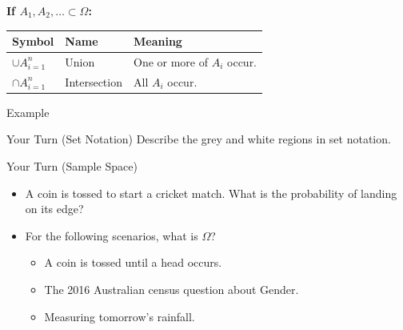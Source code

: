 \documentclass[t,xcolor=pdftex,dvipsnames,table]{beamer}\usepackage[]{graphicx}\usepackage[]{color}
\def \setA{ (0,0) circle (1cm) }
\def \setB{ (1.5,0) circle (1cm) }
\def \setC{ (0.6,1.5) circle (1cm) }
\def \setO{ (-2, -1.5) rectangle (3.5, 2.75) }
\begin{document}
\begin{frame}[fragile]{}
\vspace{.5cm}
{\bf If $A_{1}, A_{2}, \ldots \subset \Omega$:} 

\vspace{.5cm}
\begin{tabular}{lll}
Symbol & Name & Meaning \\ \hline
$\cup A_{i=1}^{n}$ & Union & One or more of $A_{i}$ occur. \\
$\cap A_{i=1}^{n}$ & Intersection & All $A_{i}$ occur. \\
\end{tabular}
\end{frame}


\begin{frame}{Example}
\begin{alertblock}{Your Turn (Set Notation)}
Describe the grey and white regions in set notation.
\begin{center}
\end{center}
\end{alertblock}
\end{frame}


\begin{frame}{}
\begin{alertblock}{Your Turn (Sample Space)}
\begin{itemize}

\item A coin is tossed to start a cricket match. What is the probability of landing on its edge? \\

\item For the following scenarios, what is $\Omega$?

\begin{itemize} 
\item A coin is tossed until a head occurs. 
\item The 2016 Australian census question about Gender.
\item Measuring tomorrow's rainfall.
\end{itemize}
\end{itemize}

\end{alertblock}
\end{frame}
\end{document}
